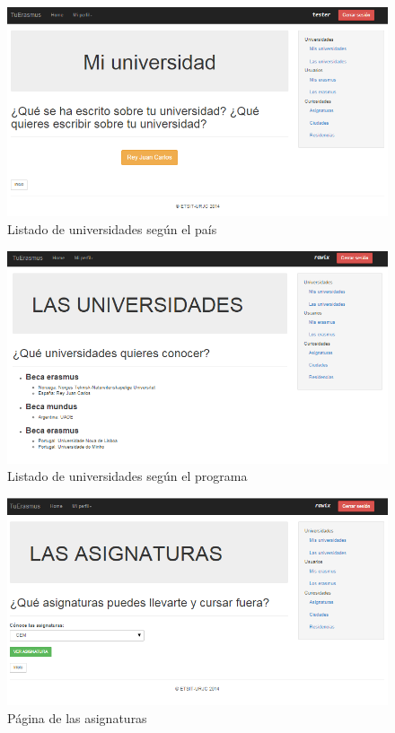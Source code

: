 \begin{figure}[htbp]
	
	\centering
	\includegraphics[scale=0.5]{./Figuras/tuerasmusPages/privatePages/myUniversity.png}
	\caption{Listado de universidades seg\'un el pa\'is}
	\label{fig:myUni}
	
\end{figure}
\begin{figure}[htbp]
	
	\centering
	\includegraphics[scale=0.4]{./Figuras/tuerasmusPages/privatePages/universities.png}
	\caption{Listado de universidades seg\'un el programa}
	\label{fig:unis}
	
\end{figure}
\begin{figure}[htbp]
	
	\centering
	\includegraphics[scale=0.4]{./Figuras/tuerasmusPages/privatePages/asignaturas.png}
	\caption{P\'agina de las asignaturas}
	\label{fig:asig}
	
\end{figure}
